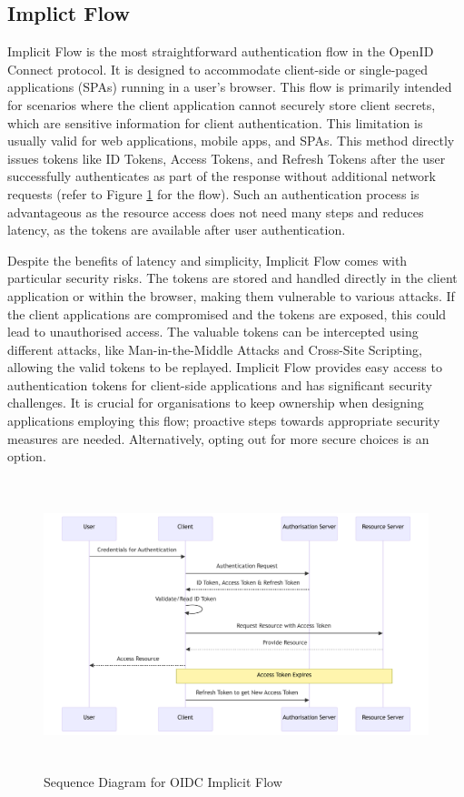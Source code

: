 \subsection{Implict Flow}
Implicit Flow is the most straightforward authentication flow in the OpenID Connect protocol.
It is designed to accommodate client-side or single-paged applications (SPAs) running in a user's browser.
This flow is primarily intended for scenarios where the client application cannot securely store client secrets, which are sensitive information for client authentication.
This limitation is usually valid for web applications, mobile apps, and SPAs.
This method directly issues tokens like ID Tokens, Access Tokens, and Refresh Tokens after the user successfully authenticates as part of the response without additional network requests (refer to Figure \ref{fig:implicit_flow} for the flow).
Such an authentication process is advantageous as the resource access does not need many steps and reduces latency, as the tokens are available after user authentication. 

Despite the benefits of latency and simplicity, Implicit Flow comes with particular security risks.
The tokens are stored and handled directly in the client application or within the browser, making them vulnerable to various attacks.
If the client applications are compromised and the tokens are exposed, this could lead to unauthorised access.
The valuable tokens can be intercepted using different attacks, like Man-in-the-Middle Attacks and Cross-Site Scripting, allowing the valid tokens to be replayed.
Implicit Flow provides easy access to authentication tokens for client-side applications and has significant security challenges.
It is crucial for organisations to keep ownership when designing applications employing this flow; proactive steps towards appropriate security measures are needed. Alternatively, opting out for more secure choices is an option.

\begin{figure}[h!]
\centering
\includegraphics[width=\textwidth, height=320px]{pics/implicit_flow.pdf}
\caption{Sequence Diagram for OIDC Implicit Flow}
\label{fig:implicit_flow}
\end{figure}

